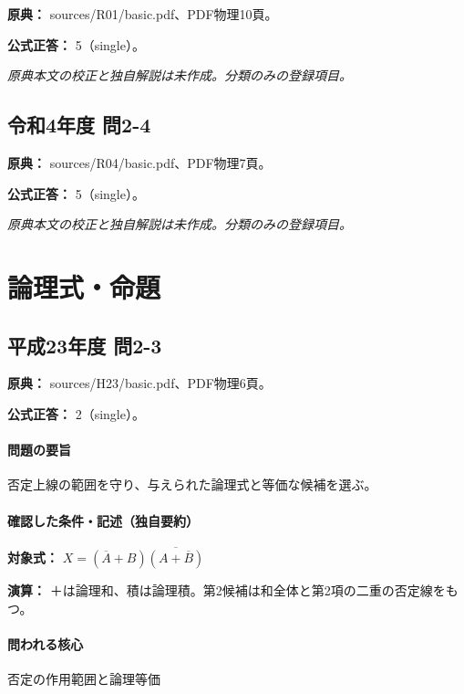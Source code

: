 \noindent\textbf{原典：} sources/R01/basic.pdf、PDF物理10頁。

\textbf{公式正答：} 5（single）。

\par\textit{原典本文の校正と独自解説は未作成。分類のみの登録項目。}

\subsection{令和4年度 問2-4}
\label{q:r04-reg-basic-2-4}

\noindent\textbf{原典：} sources/R04/basic.pdf、PDF物理7頁。

\textbf{公式正答：} 5（single）。

\par\textit{原典本文の校正と独自解説は未作成。分類のみの登録項目。}

\section{論理式・命題}

\subsection{平成23年度 問2-3}
\label{q:h23-reg-basic-2-3}

\noindent\textbf{原典：} sources/H23/basic.pdf、PDF物理6頁。

\textbf{公式正答：} 2（single）。

\paragraph{問題の要旨} 否定上線の範囲を守り、与えられた論理式と等価な候補を選ぶ。

\paragraph{確認した条件・記述（独自要約）}\mbox{}\par

\noindent\textbf{対象式：} \(X=(\overline A+B)\overline{(A+\overline B)}\)\par

\noindent\textbf{演算：} ＋は論理和、積は論理積。第2候補は和全体と第2項の二重の否定線をもつ。\par

\paragraph{問われる核心} 否定の作用範囲と論理等価

